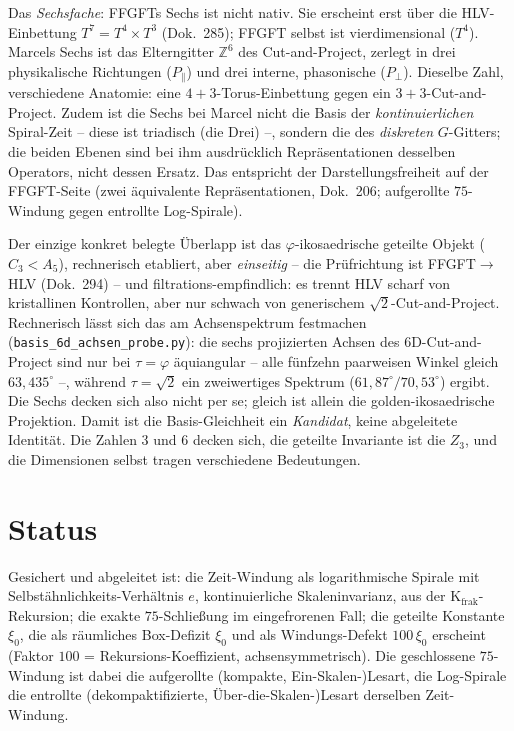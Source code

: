 Das \emph{Sechsfache}: FFGFTs Sechs ist nicht nativ. Sie erscheint erst über die HLV-Einbettung
$T^7=T^4\times T^3$ (Dok.~285); FFGFT selbst ist vierdimensional ($T^4$). Marcels Sechs ist das
Elterngitter $\mathbb{Z}^6$ des Cut-and-Project, zerlegt in drei physikalische Richtungen
($P_\parallel$) und drei interne, phasonische ($P_\perp$). Dieselbe Zahl, verschiedene Anatomie:
eine $4+3$-Torus-Einbettung gegen ein $3+3$-Cut-and-Project. Zudem ist die Sechs bei Marcel nicht
die Basis der \emph{kontinuierlichen} Spiral-Zeit -- diese ist triadisch (die Drei) --, sondern
die des \emph{diskreten} $G$-Gitters; die beiden Ebenen sind bei ihm ausdrücklich Repräsentationen
desselben Operators, nicht dessen Ersatz. Das entspricht der Darstellungsfreiheit auf der
FFGFT-Seite (zwei äquivalente Repräsentationen, Dok.~206; aufgerollte $75$-Windung gegen entrollte
Log-Spirale).

Der einzige konkret belegte Überlapp ist das $\varphi$-ikosaedrische geteilte Objekt
($C_3<A_5$), rechnerisch etabliert, aber \emph{einseitig} -- die Prüfrichtung ist
FFGFT$\to$HLV (Dok.~294) -- und filtrations-empfindlich: es trennt HLV scharf von kristallinen
Kontrollen, aber nur schwach von generischem $\sqrt2$-Cut-and-Project. Rechnerisch lässt sich das am
Achsenspektrum festmachen (\texttt{basis\_6d\_achsen\_probe.py}): die sechs projizierten Achsen des
$6$D-Cut-and-Project sind nur bei $\tau=\varphi$ äquiangular -- alle fünfzehn paarweisen Winkel
gleich $63{,}435^\circ$ --, während $\tau=\sqrt2$ ein zweiwertiges Spektrum
($61{,}87^\circ/70{,}53^\circ$) ergibt. Die Sechs decken sich also nicht per se; gleich ist allein
die golden-ikosaedrische Projektion. Damit ist die Basis-Gleichheit ein \emph{Kandidat}, keine
abgeleitete Identität. Die Zahlen $3$ und $6$ decken sich, die geteilte Invariante ist die $Z_3$,
und die Dimensionen selbst tragen verschiedene Bedeutungen.

\section{Status}
Gesichert und abgeleitet ist: die Zeit-Windung als logarithmische Spirale mit
Selbstähnlichkeits-Verhältnis $e$, kontinuierliche Skaleninvarianz, aus der
K$_{\text{frak}}$-Rekursion; die exakte $75$-Schließung im eingefrorenen Fall; die geteilte
Konstante $\xi_0$, die als räumliches Box-Defizit $\xi_0$ und als Windungs-Defekt $100\,\xi_0$
erscheint (Faktor $100$ = Rekursions-Koeffizient, achsensymmetrisch). Die geschlossene $75$-Windung
ist dabei die aufgerollte (kompakte, Ein-Skalen-)Lesart, die Log-Spirale die entrollte
(dekompaktifizierte, Über-die-Skalen-)Lesart derselben Zeit-Windung.


